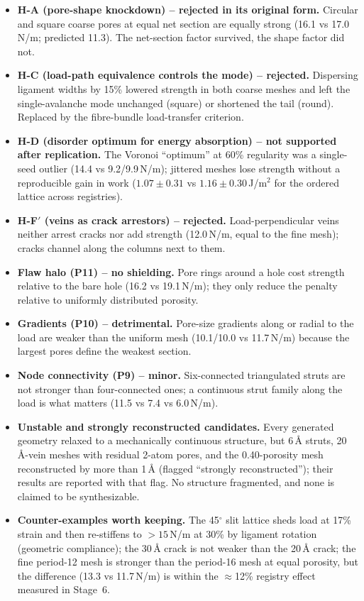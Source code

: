 \begin{itemize}
\item \textbf{H-A (pore-shape knockdown) -- rejected in its original form.} Circular and square coarse pores at equal net section are equally strong (16.1 vs 17.0\,N/m; predicted 11.3). The net-section factor survived, the shape factor did not.
\item \textbf{H-C (load-path equivalence controls the mode) -- rejected.} Dispersing ligament widths by 15\% lowered strength in both coarse meshes and left the single-avalanche mode unchanged (square) or shortened the tail (round). Replaced by the fibre-bundle load-transfer criterion.
\item \textbf{H-D (disorder optimum for energy absorption) -- not supported after replication.} The Voronoi ``optimum'' at 60\% regularity was a single-seed outlier (14.4 vs 9.2/9.9\,N/m); jittered meshes lose strength without a reproducible gain in work ($1.07\pm0.31$ vs $1.16\pm0.30$\,J/m$^2$ for the ordered lattice across registries).
\item \textbf{H-F$'$ (veins as crack arrestors) -- rejected.} Load-perpendicular veins neither arrest cracks nor add strength (12.0\,N/m, equal to the fine mesh); cracks channel along the columns next to them.
\item \textbf{Flaw halo (P11) -- no shielding.} Pore rings around a hole cost strength relative to the bare hole (16.2 vs 19.1\,N/m); they only reduce the penalty relative to uniformly distributed porosity.
\item \textbf{Gradients (P10) -- detrimental.} Pore-size gradients along or radial to the load are weaker than the uniform mesh (10.1/10.0 vs 11.7\,N/m) because the largest pores define the weakest section.
\item \textbf{Node connectivity (P9) -- minor.} Six-connected triangulated struts are not stronger than four-connected ones; a continuous strut family along the load is what matters (11.5 vs 7.4 vs 6.0\,N/m).
\item \textbf{Unstable and strongly reconstructed candidates.} Every generated geometry relaxed to a mechanically continuous structure, but 6\,\AA{} struts, 20\,\AA{}-vein meshes with residual 2-atom pores, and the 0.40-porosity mesh reconstructed by more than 1\,\AA{} (flagged ``strongly reconstructed''); their results are reported with that flag. No structure fragmented, and none is claimed to be synthesizable.
\item \textbf{Counter-examples worth keeping.} The 45$^\circ$ slit lattice sheds load at 17\% strain and then re-stiffens to $>15$\,N/m at 30\% by ligament rotation (geometric compliance); the 30\,\AA{} crack is not weaker than the 20\,\AA{} crack; the fine period-12 mesh is stronger than the period-16 mesh at equal porosity, but the difference (13.3 vs 11.7\,N/m) is within the $\approx$12\% registry effect measured in Stage~6.
\end{itemize}
